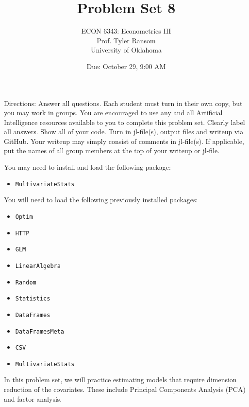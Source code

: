 \documentclass[12pt,english]{article}
\begin{document}
\title{Problem Set 8}
\author{ECON 6343: Econometrics III\\
Prof. Tyler Ransom\\
University of Oklahoma}
\date{Due: October 29, 9:00 AM}

\maketitle
Directions: Answer all questions. Each student must turn in their own copy, but you may work in groups. You are encouraged to use any and all Artificial Intelligence resources available to you to complete this problem set. Clearly label all answers. Show all of your code. Turn in jl-file(s), output files and writeup via GitHub. Your writeup may simply consist of comments in jl-file(s). If applicable, put the names of all group members at the top of your writeup or jl-file.

You may need to install and load the following package:
\begin{itemize}
 \item[~] \texttt{MultivariateStats}
\end{itemize}

You will need to load the following previously installed packages:
\begin{itemize}
    \item[~] \texttt{Optim} 
    \item[~] \texttt{HTTP} 
    \item[~] \texttt{GLM} 
    \item[~] \texttt{LinearAlgebra} 
    \item[~] \texttt{Random} 
    \item[~] \texttt{Statistics} 
    \item[~] \texttt{DataFrames} 
    \item[~] \texttt{DataFramesMeta} 
    \item[~] \texttt{CSV} 
    \item[~] \texttt{MultivariateStats} 
\end{itemize}
\pagebreak
In this problem set, we will practice estimating models that require dimension reduction of the covariates. These include Principal Components Analysis (PCA) and factor analysis.
\end{document}
